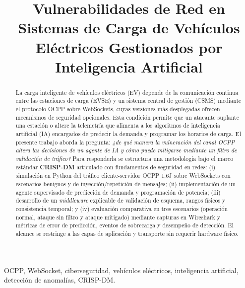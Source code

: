 \documentclass[conference]{IEEEtran}
\begin{document}
\title{Vulnerabilidades de Red en Sistemas de Carga de Vehículos Eléctricos Gestionados por Inteligencia Artificial}

\author{
}

\maketitle

\begin{abstract}
La carga inteligente de vehículos eléctricos (EV) depende de la comunicación continua entre las estaciones de carga (EVSE) y un sistema central de gestión (CSMS) mediante el protocolo OCPP sobre WebSockets, cuyas versiones más desplegadas ofrecen mecanismos de seguridad opcionales. Esta condición permite que un atacante suplante una estación o altere la telemetría que alimenta a los algoritmos de inteligencia artificial (IA) encargados de predecir la demanda y programar los horarios de carga. El presente trabajo aborda la pregunta: \textit{¿de qué manera la vulneración del canal OCPP altera las decisiones de un agente de IA y cómo puede mitigarse mediante un filtro de validación de tráfico?} Para responderla se estructura una metodología bajo el marco estándar \textbf{CRISP-DM} articulado con fundamentos de seguridad en redes: (i) simulación en Python del tráfico cliente-servidor OCPP 1.6J sobre WebSockets con escenarios benignos y de inyección/repetición de mensajes; (ii) implementación de un agente supervisado de predicción de demanda y programación de potencia; (iii) desarrollo de un \textit{middleware} explicable de validación de esquema, rangos físicos y consistencia temporal; y (iv) evaluación comparativa en tres escenarios (operación normal, ataque sin filtro y ataque mitigado) mediante capturas en Wireshark y métricas de error de predicción, eventos de sobrecarga y desempeño de detección. El alcance se restringe a las capas de aplicación y transporte sin requerir hardware físico.
\end{abstract}

\begin{IEEEkeywords}
OCPP, WebSocket, ciberseguridad, vehículos eléctricos, inteligencia artificial, detección de anomalías, CRISP-DM.
\end{IEEEkeywords}
\end{document}
